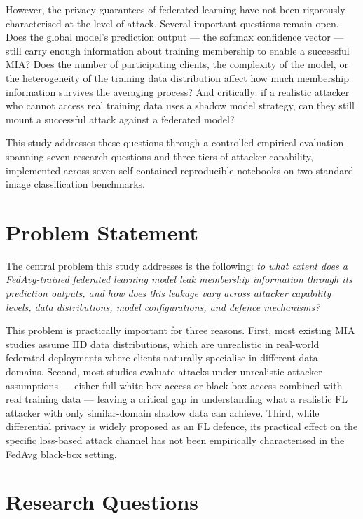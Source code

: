 \documentclass[12pt, a4paper]{report}
\begin{document}
However, the privacy guarantees of federated learning have not been rigorously
characterised at the level of attack. Several important questions remain open.
Does the global model's prediction output --- the softmax confidence vector ---
still carry enough information about training membership to enable a successful
MIA? Does the number of participating clients, the complexity of the model, or
the heterogeneity of the training data distribution affect how much membership
information survives the averaging process? And critically: if a realistic
attacker who cannot access real training data uses a shadow model strategy, can
they still mount a successful attack against a federated model?

This study addresses these questions through a controlled empirical evaluation
spanning seven research questions and three tiers of attacker capability,
implemented across seven self-contained reproducible notebooks on two standard
image classification benchmarks.

\section{Problem Statement}

The central problem this study addresses is the following: \textit{to what extent
does a FedAvg-trained federated learning model leak membership information through
its prediction outputs, and how does this leakage vary across attacker capability
levels, data distributions, model configurations, and defence mechanisms?}

This problem is practically important for three reasons. First, most existing MIA
studies assume IID data distributions, which are unrealistic in real-world
federated deployments where clients naturally specialise in different data domains.
Second, most studies evaluate attacks under unrealistic attacker assumptions ---
either full white-box access or black-box access combined with real training data
--- leaving a critical gap in understanding what a realistic FL attacker with
only similar-domain shadow data can achieve. Third, while differential privacy
is widely proposed as an FL defence, its practical effect on the specific
loss-based attack channel has not been empirically characterised in the FedAvg
black-box setting.

\section{Research Questions}
\end{document}

